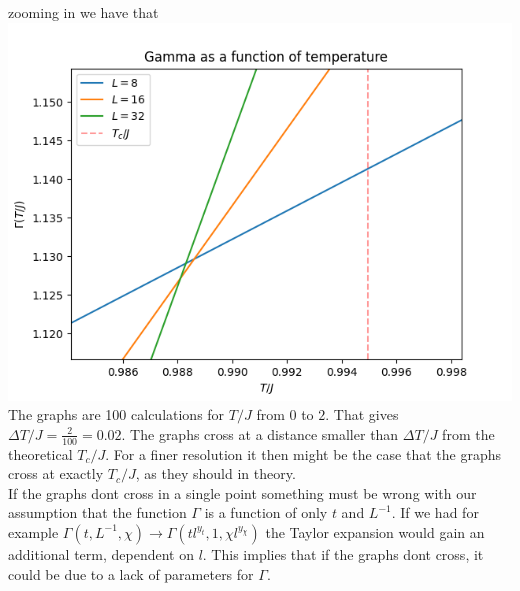 \documentclass[12pt]{article}
\begin{document}
zooming in we have that \\
\includegraphics[width = \textwidth]{gamma_zoom.png}\\
The graphs are 100 calculations for $T/J$ from $0$ to $2$. That gives $\Delta
T/J = \frac{2}{100} = 0.02$. The graphs cross at a distance smaller than $\Delta
T/J$ from the theoretical $T_c/J$. For a finer resolution it then might be the
case that the graphs cross at exactly $T_c/J$, as they should in theory. \\
If the graphs dont cross in a single point something must be wrong with our
assumption that the function $\Gamma$ is a function of only $t$ and $L^{-1}$.
If we had for example $\Gamma(t, L^{-1}, \chi) \to \Gamma(tl^{y_t}, 1, \chi
l^{y_\chi})$ the Taylor expansion would gain an additional term, dependent on
$l$. This implies that if the graphs dont cross, it could be due to a lack of
parameters for $\Gamma$.
\end{document}
